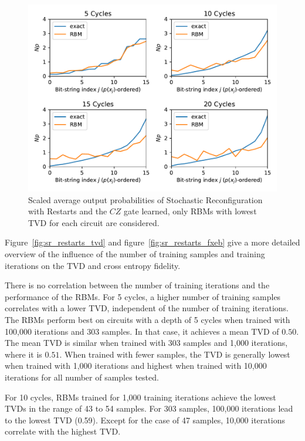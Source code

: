 \begin{figure}[H]
  \centering
  \includegraphics[width=\textwidth]{figures/results/SR-restarts-learned/avgBestPDF.pdf}
  \caption[Averaged best performing scaled output probabilities of Stochastic Reconfiguration with Restarts Learned]{
    Scaled average output probabilities of Stochastic Reconfiguration with Restarts and the $CZ$ gate learned, only RBMs with lowest
    TVD for each circuit are considered.}
  \label{fig:sr_restarts_bestPDF}
\end{figure}

Figure~\ref{fig:sr_restarts_tvd} and figure~\ref{fig:sr_restarts_fxeb} give a more detailed overview of the influence of the 
number of training samples and training iterations on the TVD and cross entropy fidelity. 

There is no correlation between the number of training
iterations and the performance of the RBMs. For 5 cycles, a higher number of training samples correlates
with a lower TVD, independent of the number of training iterations. The RBMs perform best on 
circuits with a depth of 5 cycles when trained with 100,000 iterations and 303 samples. In that case, 
it achieves a mean TVD of $0.50$. The mean TVD is similar when trained with 303 samples and 1,000 iterations, 
where it is $0.51$. When trained with fewer samples, the TVD is generally lowest when trained with 1,000 
iterations and highest when trained with 10,000 iterations for all number of samples tested. 

For 10 cycles, RBMs trained for 1,000 training iterations achieve the lowest TVDs in the range of 43 to 
54 samples. For 303 samples, 100,000 iterations lead to the lowest TVD (0.59). Except for the 
case of 47 samples, 10,000 iterations correlate with the highest TVD.

